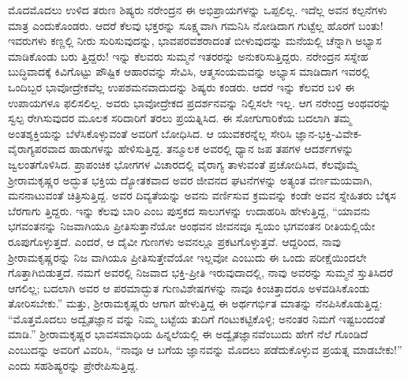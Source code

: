 ಮೊದಮೊದಲು ಉಳಿದ ತರುಣ ಶಿಷ್ಯರು ನರೇಂದ್ರನ ಈ ಅಭಿಪ್ರಾಯಗಳನ್ನು ಒಪ್ಪಲಿಲ್ಲ. ಇದೆಲ್ಲ ಅವನ ಕಲ್ಪನೆಗಳು ಮಾತ್ರ ಎಂದುಕೊಂಡರು. ಆದರೆ ಕೆಲವು ಭಕ್ತರನ್ನು ಸೂಕ್ಷ್ಮವಾಗಿ ಗಮನಿಸಿ ನೋಡಿದಾಗ ಗುಟ್ಟೆಲ್ಲ ಹೊರಗೆ ಬಂತು! ಇವರುಗಳು ಕಣ್ಣಲ್ಲಿ ನೀರು ಸುರಿಸುವುದನ್ನು, ಭಾವಪರವಶರಾದಂತೆ ಬೀಳುವುದನ್ನು ಮನೆಯಲ್ಲಿ ಚೆನ್ನಾಗಿ ಅಭ್ಯಾಸ ಮಾಡಿಕೊಂಡು ಬರು ತ್ತಿದ್ದರು! ಇನ್ನು ಕೆಲವರು ಸುಮ್ಮನೆ ಇತರರನ್ನು ಅನುಕರಿಸುತ್ತಿದ್ದರು. ನರೇಂದ್ರನ ಸಸ್ನೇಹ ಬುದ್ಧಿವಾದಕ್ಕೆ ಕಿವಿಗೊಟ್ಟು ಪೌಷ್ಟಿಕ ಆಹಾರವನ್ನು ಸೇವಿಸಿ, ಆತ್ಮಸಂಯಮವನ್ನು ಅಭ್ಯಾಸ ಮಾಡಿದಾಗ ಇವರಲ್ಲಿ ಒಂದಿಬ್ಬರ ಭಾವೋದ್ರೇಕವೆಲ್ಲ ಉಪಶಮನವಾದುದನ್ನು ಶಿಷ್ಯರು ಕಂಡರು. ಆದರೆ ಇನ್ನು ಕೆಲವರ ಬಳಿ ಈ ಉಪಾಯಗಳೂ ಫಲಿಸಲಿಲ್ಲ. ಅವರು ಭಾವೋದ್ರೇಕದ ಪ್ರದರ್ಶನವನ್ನು ನಿಲ್ಲಿಸಲೇ ಇಲ್ಲ. ಆಗ ನರೇಂದ್ರ ಅಂಥವರನ್ನು ಸ್ವಲ್ಪ ರೇಗಿಸುವುದರ ಮೂಲಕ ಸರಿದಾರಿಗೆ ತರಲು ಪ್ರಯತ್ನಿಸಿದ. ಈ ಸೋಗುಗಾರಿಕೆಯ ಬದಲಾಗಿ ತಮ್ಮ ಅಂತಶ್ಶಕ್ತಿಯನ್ನು ಬೆಳೆಸಿಕೊಳ್ಳುವಂತೆ ಅವರಿಗೆ ಬೋಧಿಸಿದ. ಆ ಯುವಕರನ್ನೆಲ್ಲ ಸೇರಿಸಿ ಜ್ಞಾನ-ಭಕ್ತಿ-ವಿವೇಕ- ವೈರಾಗ್ಯಪರವಾದ ಹಾಡುಗಳನ್ನು ಹೇಳಿಸುತ್ತಿದ್ದ. ತನ್ಮೂಲಕ ಅವರಲ್ಲಿ ಧ್ಯಾನ ಜಪ ತಪಗಳ ಆದರ್ಶಗಳನ್ನು ಜ್ವಲಂತಗೊಳಿಸಿದ. ಪ್ರಾಪಂಚಿಕ ಭೋಗಗಳ ವಿಚಾರದಲ್ಲಿ ವೈರಾಗ್ಯ ತಾಳುವಂತೆ ಪ್ರಚೋದಿಸಿದ, ಕೆಲವೊಮ್ಮೆ ಶ್ರೀರಾಮಕೃಷ್ಣರ ಅದ್ಭುತ ಭಕ್ತಿಯ ದ್ಯೋತಕವಾದ ಅವರ ಜೀವನದ ಘಟನೆಗಳನ್ನು ಅತ್ಯಂತ ವರ್ಣಮಯವಾಗಿ, ಮನನಾಟುವಂತೆ ಚಿತ್ರಿಸುತ್ತಿದ್ದ. ಅವರ ದಿವ್ಯತೆಯನ್ನು ಅವನು ವರ್ಣಿಸುವ ಕ್ರಮವನ್ನು ಕಂಡೇ ಅವನ ಸ್ನೇಹಿತರು ಬೆಕ್ಕಸ ಬೆರಗಾಗು ತ್ತಿದ್ದರು. ಇನ್ನು ಕೆಲವು ಬಾರಿ  ಎಂಬ ಪುಸ್ತಕದ ಸಾಲುಗಳನ್ನು ಉದಾಹರಿಸಿ ಹೇಳುತ್ತಿದ್ದ, “ಯಾವನು ಭಗವಂತನನ್ನು ನಿಜವಾಗಿಯೂ ಪ್ರೀತಿಸುತ್ತಾನೆಯೋ ಅಂಥವನ ಜೀವನವೂ ಸ್ವಯಂ ಭಗವಂತನ ರೀತಿಯಲ್ಲಿಯೇ ರೂಪುಗೊಳ್ಳುತ್ತದೆ. ಎಂದರೆ, ಆ ದೈವೀ ಗುಣಗಳು ಅವನಲ್ಲೂ ಪ್ರಕಟಗೊಳ್ಳುತ್ತವೆ. ಆದ್ದರಿಂದ, ನಾವು ಶ್ರೀರಾಮಕೃಷ್ಣರನ್ನು ನಿಜ ವಾಗಿಯೂ ಪ್ರೀತಿಸುತ್ತೇವೆಯೋ ಇಲ್ಲವೋ ಎಂಬುದು ಈ ಒಂದು ಪರೀಕ್ಷೆಯಿಂದಲೇ ಗೊತ್ತಾಗಿಬಿಡುತ್ತದೆ. ನಮಗೆ ಅವರಲ್ಲಿ ನಿಜವಾದ ಭಕ್ತಿ-ಪ್ರೀತಿ ಇರುವುದಾದಲ್ಲಿ, ನಾವು ಅವರನ್ನು ಸುಮ್ಮನೆ ಸ್ತುತಿಸಿದರೆ ಆಗಲಿಲ್ಲ; ಬದಲಾಗಿ ಅವರ ಆ ಪರಮಾದ್ಭುತ ಗುಣವಿಶೇಷಗಳನ್ನು ನಾವೂ ಕಿಂಚಿತ್ತಾದರೂ ಅಳವಡಿಸಿಕೊಂಡು ತೋರಿಸಬೇಕು.” ಮತ್ತು, ಶ್ರೀರಾಮಕೃಷ್ಣರು ಆಗಾಗ ಹೇಳುತ್ತಿದ್ದ ಈ ಅರ್ಥಗರ್ಭಿತ ಮಾತನ್ನು ನೆನಪಿಸಿಕೊಡುತ್ತಿದ್ದ: “ಮೊತ್ತಮೊದಲು ಅದ್ವೈತಜ್ಞಾನ ವನ್ನು ನಿಮ್ಮ ಬಟ್ಟೆಯ ತುದಿಗೆ ಗಂಟುಕಟ್ಟಿಕೊಳ್ಳಿ; ಅನಂತರ ನಿಮಗೆ ಇಷ್ಟಬಂದಂತೆ ಮಾಡಿ.” ಶ್ರೀರಾಮಕೃಷ್ಣರ ಭಾವಸಮಾಧಿಯ ಹಿನ್ನಲೆಯಲ್ಲಿ ಈ ಅದ್ವೈತಜ್ಞಾನವೆಂಬುದು ಹೇಗೆ ನೆಲೆ ಗೊಂಡಿದೆ ಎಂಬುದನ್ನು ಅವರಿಗೆ ವಿವರಿಸಿ, “ನಾವೂ ಆ ಬಗೆಯ ಜ್ಞಾನವನ್ನು ಮೊದಲು ಪಡೆದುಕೊಳ್ಳುವ ಪ್ರಯತ್ನ ಮಾಡಬೇಕು!” ಎಂದು ಸಹಶಿಷ್ಯರನ್ನು ಪ್ರೇರೇಪಿಸುತ್ತಿದ್ದ. 

